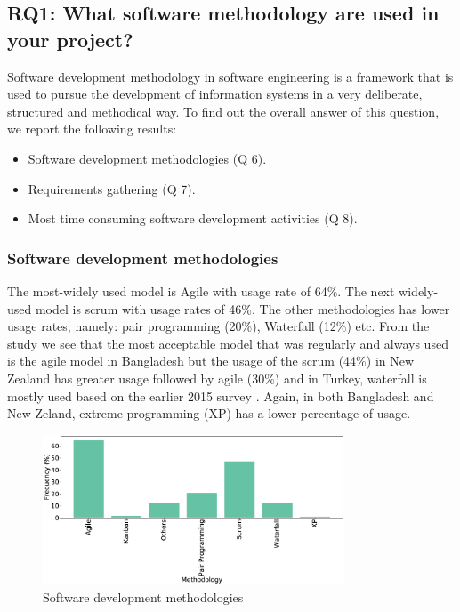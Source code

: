 \subsection{RQ1: What software methodology are used in your project?}
\label{RQ1}
Software development methodology in software engineering is a framework that is used to pursue the development of information systems in a very deliberate, structured and methodical way. To find out the overall answer of this question, we report the following results:
\begin{itemize}
\item Software development methodologies (Q 6).
\item Requirements gathering (Q 7).
\item Most time consuming software development activities (Q 8).
\end{itemize}

\subsubsection{Software development methodologies}
The most-widely used model is Agile with usage rate of 64\%. The next widely-used model is scrum with usage rates of 46\%. The other methodologies has lower usage rates, namely: pair programming (20\%), Waterfall (12\%) etc. From the study we see that the most acceptable model that was regularly and always used is the agile model in Bangladesh but the usage of the scrum (44\%) in New Zealand has greater usage followed by agile (30\%) \citep{Wang2018} and in Turkey, waterfall is mostly used based on the earlier 2015 survey \citep{Garousi2015}. Again, in both Bangladesh and New Zeland, extreme programming (XP) has a lower percentage of usage.
\begin{figure}[htbp]
\centering
  \includegraphics[width=0.8\textwidth]{Figures/Respondents_Methodology}
  \caption{Software development methodologies}
  \label{fig:methodologies}
\end{figure}

